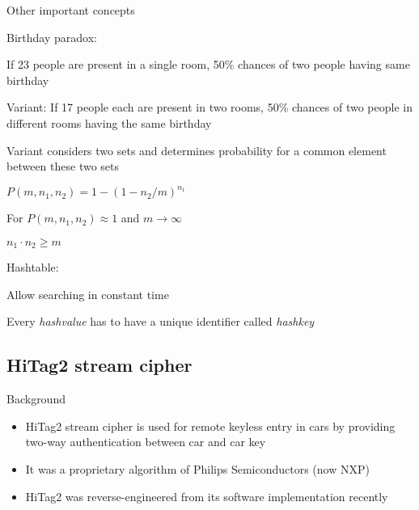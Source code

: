 \documentclass{beamer}
\begin{document}
\begin{frame}{Other important concepts}
\begin{itemize}
\footnotesize{	
	\item Birthday paradox:
	\begin{itemize}
	\footnotesize{	
		\item If 23 people are present in a single room, 50\% chances of two people having same birthday
		\item Variant: If 17 people each are present in two rooms, 50\% chances of two people in different rooms having the same birthday
		\item Variant considers two sets and determines probability for a common element between these two sets\\
		\begin{center}
			$P(m, n_1, n_2) = 1 -(1 - n_2/m)^{n_1}$\\
		\end{center}
		\item For $P(m, n_1, n_2) \approx 1$ and $m \rightarrow \infty$
		\begin{center}
			$n_1 \cdot n_2 \geq m$
		\end{center}
	}\end{itemize}

	\item Hashtable:
	\begin{itemize}
	\footnotesize{	
		\item Allow searching in constant time
		\item Every \emph{hashvalue} has to have a unique identifier called \emph{hashkey}
	}\end{itemize}
	
}\end{itemize}
		


\end{frame}

\subsection{HiTag2 stream cipher}

\begin{frame}{Background}
\begin{itemize}
\item HiTag2 stream cipher is used for remote keyless entry in cars by providing two-way authentication between car and car key
\item It was a proprietary algorithm of Philips Semiconductors (now NXP)
\item HiTag2 was reverse-engineered from its software implementation recently
\end{itemize}
\end{frame}
\end{document}
